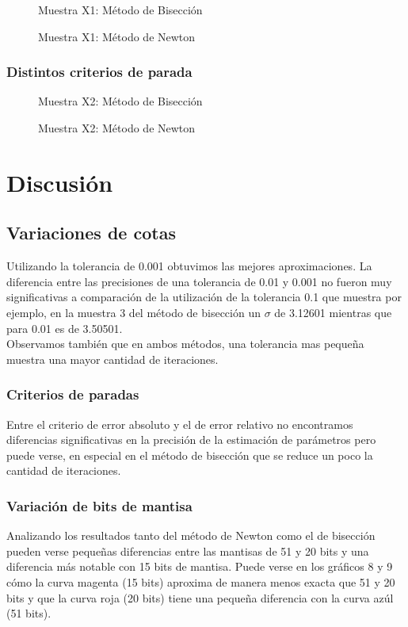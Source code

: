 \documentclass[a4paper,10pt,twoside]{article}
\newcommand{\grafico}[2]{
	\begin{figure}[H]
		\caption{#2}
		\centering
		
	\end{figure}
}
\begin{document}
\grafico{biseccion-mantisas.tex}{Muestra X1: Método de Bisección}
\grafico{newton-mantisas.tex}{Muestra X1: Método de Newton}
             
\subsubsection{Distintos criterios de parada}

\grafico{biseccion-criterios-parada.tex}{Muestra X2: Método de Bisección}
\grafico{newton-criterios-parada.tex}{Muestra X2: Método de Newton}




\section{Discusión}

\subsection{Variaciones de cotas}
Utilizando la tolerancia de 0.001 obtuvimos las mejores aproximaciones. La diferencia entre las precisiones de una tolerancia de 0.01 y 0.001 no fueron muy significativas a comparación de la utilización de la tolerancia 0.1 que muestra por ejemplo, en la muestra 3 del método de bisección un $\sigma$ de 3.12601 mientras que para 0.01 es de 3.50501. \\
Observamos también que en ambos métodos, una tolerancia mas pequeña muestra una mayor cantidad de iteraciones.

\subsubsection{Criterios de paradas}
Entre el criterio de error absoluto y el de error relativo no encontramos diferencias significativas en la precisión de la estimación de parámetros pero puede verse, en especial en el método de bisección que se reduce un poco la cantidad de iteraciones.

\subsubsection{Variación de bits de mantisa}
Analizando los resultados tanto del método de Newton como el de bisección pueden verse pequeñas diferencias entre las mantisas de 51 y 20 bits y una diferencia más notable con 15 bits de mantisa. Puede verse en los gráficos 8 y 9 cómo la curva magenta (15 bits) aproxima de manera menos exacta que 51 y 20 bits y que la curva roja (20 bits) tiene una pequeña diferencia con la curva azúl (51 bits).
\end{document}
